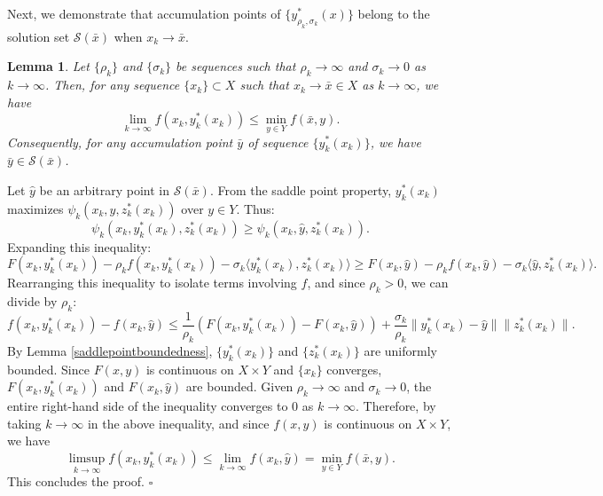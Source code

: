 \documentclass{article}
\newtheorem{lemma}[theorem]{Lemma}
\newenvironment{proof}[1][Proof]{\par
	\normalfont\topsep6pt\relax
	\trivlist\item[\hskip\labelsep\itshape #1.]\ignorespaces
}{%
	\hfill\ensuremath{\square}\endtrivlist
}
\begin{document}
Next, we demonstrate that accumulation points of $\{y^*_{\rho_k,\sigma_k}(x)\}$ belong to the solution set $\mathcal{S}(\bar{x})$ when $x_k \rightarrow \bar{x}$.

\begin{lemma}\label{valueofy}
Let $\{\rho_k\}$ and $\{\sigma_k\}$ be sequences such that $\rho_k \rightarrow \infty$ and $\sigma_k \rightarrow 0$ as $k \rightarrow \infty$. Then, for any sequence $\{x_k\} \subset X$ such that $x_k \rightarrow \bar{x} \in X$ as $k \rightarrow \infty$, we have
	\begin{equation}
	\lim\limits_{k\to\infty}f(x_k,y_{k}^*(x_k))\le  \min_{y \in Y} f(\bar{x}, y).
	\end{equation}
Consequently, for any accumulation point $\bar{y}$ of sequence $\{y_{k}^*(x_k)\}$, we have $\bar{y} \in \mathcal{S}(\bar{x})$.
\end{lemma}
	 \begin{proof}
     Let $\hat{y}$ be an arbitrary point in $\mathcal{S}(\bar{x})$. From the saddle point property, $y_k^*(x_k)$ maximizes $\psi_{k}(x_k, y, z_k^*(x_k))$ over $y \in Y$. Thus:
\[
\psi_{k}(x_k, y_k^*(x_k), z_k^*(x_k)) \ge \psi_{k}(x_k, \hat{y}, z_k^*(x_k)). 
\]
Expanding this inequality:
\[
F(x_k,y_{k}^*(x_{k})) - \rho_k f(x_k,  y_{k}^*(x_{k})) - \sigma_k \langle y_{k}^*(x_{k}), z_k^*(x_k) \rangle \ge F(x_k, \hat{y}) - \rho_k f(x_k, \hat{y}) - \sigma_k \langle \hat{y}, z_k^*(x_k) \rangle. 
\]
Rearranging this inequality to isolate terms involving $f$, and since $\rho_k > 0$, we can divide by $\rho_k$:
\[
f(x_k,  y_{k}^*(x_{k})) - f(x_k, \hat{y}) \le \frac{1}{\rho_k}\left( F(x_k,y_{k}^*(x_{k})) - F(x_k, \hat{y})\right) + \frac{\sigma_k}{\rho_k} \|y_{k}^*(x_{k}) - \hat{y}\| \| z_k^*(x_k) \|.
\]
By Lemma \ref{saddlepointboundedness}, $\{y_{k}^*(x_k)\}$ and $\{z_{k}^*(x_k)\}$ are uniformly bounded. Since $F(x,y)$ is continuous on $X \times Y$ and $\{x_k\}$ converges, $F(x_k,y_{k}^*(x_{k}))$ and $F(x_k, \hat{y})$ are bounded. Given $\rho_k \rightarrow \infty$ and $\sigma_k \rightarrow 0$, the entire right-hand side of the inequality converges to $0$ as $k \rightarrow \infty$. Therefore, by taking $k \rightarrow \infty$ in the above inequality, and since $f(x,y)$ is continuous on $X \times Y$, we have 
\[
\limsup_{k \rightarrow \infty} f(x_k,  y_{k}^*(x_{k})) \le \lim_{k \rightarrow \infty} f(x_k, \hat{y}) = \min_{y \in Y} f(\bar{x}, y).
\]
This concludes the proof.
\end{proof}
\end{document}
